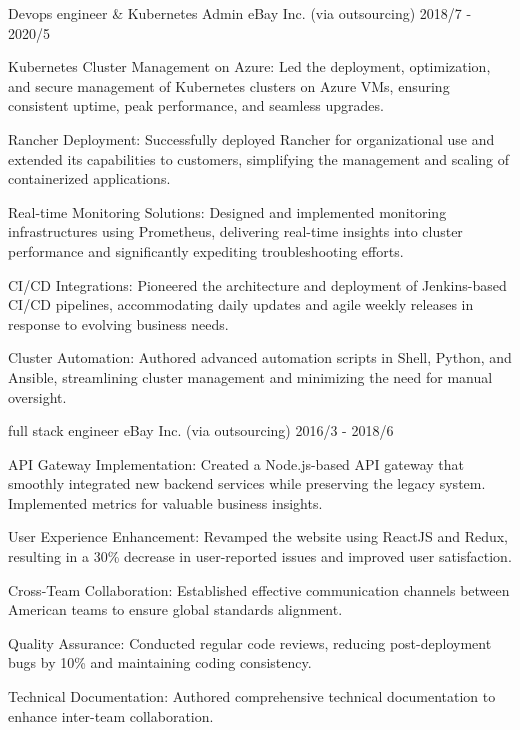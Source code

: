 \begin{cventries}
  \cventry
    {Devops engineer \& Kubernetes Admin} %
    {eBay Inc. \tiny{(via outsourcing)}} %
    {} %
    {2018/7 - 2020/5} %
    {
      \begin{cvitems} %
        \item {Kubernetes Cluster Management on Azure: Led the deployment, optimization, and secure management of Kubernetes clusters on Azure VMs, ensuring consistent uptime, peak performance, and seamless upgrades.}
        \item {Rancher Deployment: Successfully deployed Rancher for organizational use and extended its capabilities to customers, simplifying the management and scaling of containerized applications.}
        \item {Real-time Monitoring Solutions: Designed and implemented monitoring infrastructures using Prometheus, delivering real-time insights into cluster performance and significantly expediting troubleshooting efforts.        }
        \item {CI/CD Integrations: Pioneered the architecture and deployment of Jenkins-based CI/CD pipelines, accommodating daily updates and agile weekly releases in response to evolving business needs.        }
        \item {Cluster Automation: Authored advanced automation scripts in Shell, Python, and Ansible, streamlining cluster management and minimizing the need for manual oversight.        }
      \end{cvitems}
    }
  \cventry
    {full stack engineer } %
    {eBay Inc. \tiny{(via outsourcing)}} %
    {} %
    {2016/3 - 2018/6} %
    {
      \begin{cvitems} %
        \item {API Gateway Implementation: Created a Node.js-based API gateway that smoothly integrated new backend services while preserving the legacy system. Implemented metrics for valuable business insights.}
        \item {User Experience Enhancement: Revamped the website using ReactJS and Redux, resulting in a 30\% decrease in user-reported issues and improved user satisfaction.  }
        \item {Cross-Team Collaboration: Established effective communication channels between American teams to ensure global standards alignment.    }
        \item {Quality Assurance: Conducted regular code reviews, reducing post-deployment bugs by 10\% and maintaining coding consistency.    }
        \item {Technical Documentation: Authored comprehensive technical documentation to enhance inter-team collaboration.    }
      \end{cvitems}
    }


\end{cventries}
